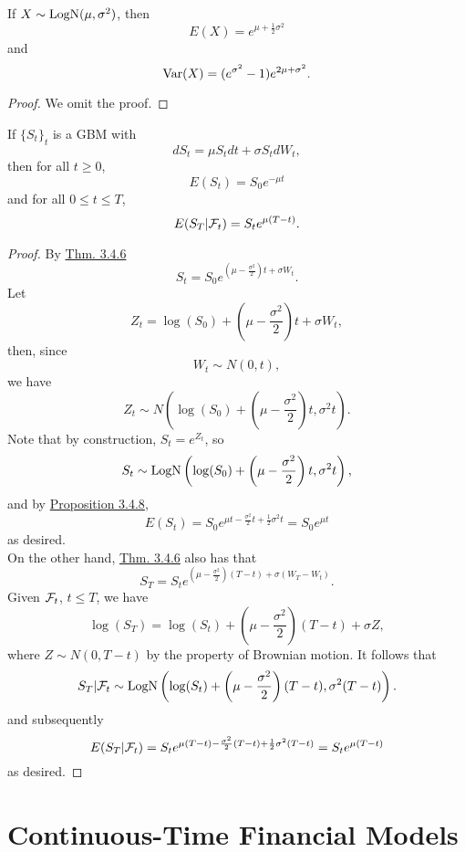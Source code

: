 \documentclass[11pt,fleqn]{book} %
\begin{document}
\begin{proposition} \label{prop:348}
If \(X \sim \operatorname{LogN}(\mu, \sigma^2)\), then
\[
E(X) = e^{\mu + \frac12\sigma^2}
\]
and
\[
\operatorname{Var}(X) = (e^{\sigma^2} - 1)e^{2\mu + \sigma^2}.
\]
\end{proposition}
\begin{proof}
    We omit the proof.
\end{proof}

\begin{proposition} \label{prop:349}
If \(\{S_t\}_t\) is a GBM with
\[
dS_t = \mu S_tdt + \sigma S_tdW_t,
\]
then for all \(t \geq 0\),
\[
E(S_t) = S_0e^{-\mu t}
\]
and for all \(0 \leq t \leq T\),
\[
E(S_T|\mathcal{F}_t) = S_te^{\mu(T - t)}.
\]
\end{proposition}
\begin{proof}
By \hyperref[thm:346]{Thm. 3.4.6}
\[
S_t = S_0e^{\left(\mu - \frac{\sigma^2}{2}\right)t + \sigma W_t}.
\]
\indent Let
\[
Z_t = \log(S_0) + \left(\mu - \frac{\sigma^2}{2}\right)t + \sigma W_t,
\]
then, since
\[
W_t \sim N(0, t),
\]
we have
\[
Z_t \sim N\left(\log(S_0) + \left(\mu - \frac{\sigma^2}{2}\right)t, \sigma^2t\right).
\]
\indent Note that by construction, \(S_t = e^{Z_t}\), so
\[
S_t \sim \operatorname{LogN}\left(\log(S_0) + \left(\mu - \frac{\sigma^2}{2}\right)t, \sigma^2t\right),
\]
and by \hyperref[prop:348]{Proposition 3.4.8},
\[
E(S_t) = S_0e^{\mu t - \frac{\sigma^2}{2}t + \frac12\sigma^2t} = S_0e^{\mu t}
\]
as desired. \\
\indent On the other hand, \hyperref[thm:346]{Thm. 3.4.6} also has that
\[
S_T = S_te^{\left(\mu - \frac{\sigma^2}{2}\right)(T - t) + \sigma (W_T - W_t)}.
\]
\indent Given \(\mathcal{F}_t\), \(t \leq T\), we have
\[
\log(S_T) = \log(S_t) + \left(\mu - \frac{\sigma^2}{2}\right)(T - t) + \sigma Z,
\]
where \(Z \sim N(0, T - t)\) by the property of Brownian motion. It follows that
\[
S_T|\mathcal{F}_t \sim \operatorname{LogN}\left(\log(S_t) + \left(\mu - \frac{\sigma^2}{2}\right)(T - t), \sigma^2(T - t)\right).
\]
and subsequently
\[
E(S_T|\mathcal{F}_t) = S_te^{\mu(T - t) - \frac{\sigma^2}{2}(T - t) + \frac12\sigma^2(T - t)} = S_te^{\mu(T - t)}
\]
as desired.
\end{proof}



\chapter{Continuous-Time Financial Models}
\end{document}
